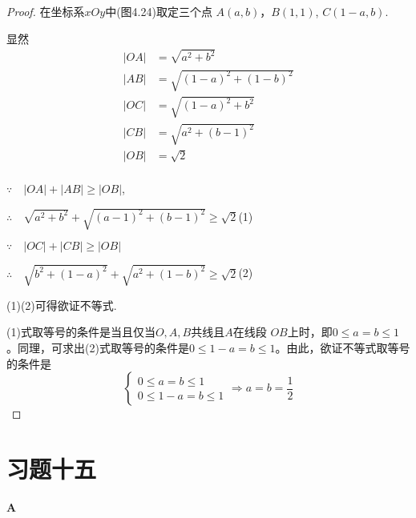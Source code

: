 \begin{proof}

\noindent
\begin{minipage}{.45\textwidth}
    在坐标系$xOy$中(图4.24)取定三个点
$A(a,b)$，$B(1,1)$, $C(1-a,b)$.

显然
\[\begin{split}
|OA|&=\sqrt{a^2+b^2}\\
|AB|&=\sqrt{(1-a)^2+(1-b)^2}\\
|OC|&=\sqrt{(1-a)^2+b^2}\\
|CB|&=\sqrt{a^2+(b-1)^2}\\
|OB|&=\sqrt{2}\\
\end{split}\]
\end{minipage}
\begin{minipage}{.45\textwidth}
\centering
{}
\end{minipage}

$\because\quad |OA|+|AB|\geqslant|OB|$,

$\therefore\quad \sqrt {a^{2}+ b^{2}}+ \sqrt {( a- 1) ^{2}+ ( b- 1) ^{2}}\geq \sqrt {2}$\hfill (1)

$\because\quad \left | OC\right | + \left | CB\right | \geqslant \left | OB\right | $

$\therefore\quad \sqrt{b^{2}+(1-a)^{2}}+\sqrt{a^{2}+(1-b)^{2}}\geqslant\sqrt{2}$\hfill (2)

(1)(2)可得欲证不等式.

(1)式取等号的条件是当且仅当$O,A,B$共线且$A$在线段
$OB$上时，即$0\le a=b\le 1$。同理，可求出(2)式取等号的条件是$0\le 1-a=b\le 1$。由此，欲证不等式取等号的条件是
\[\begin{cases}
    0\le a=b\le 1\\
    0\le 1-a=b\le 1
\end{cases} \Longrightarrow a=b=\frac{1}{2}\]
\end{proof}


\section*{习题十五}
\begin{center}
    \bfseries A
\end{center}

